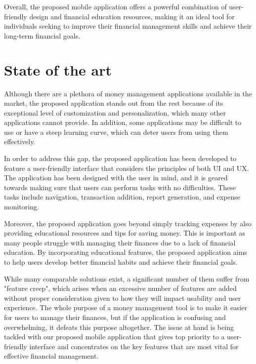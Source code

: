 \hspace{\parindent}Overall, the proposed mobile application offers a powerful combination of user-friendly design and financial education resources, making it an ideal tool for individuals seeking to improve their financial management skills and achieve their long-term financial goals.

\section{State of the art}\label{sect:State of the art}
\hspace{\parindent} Although there are a plethora of money management applications available in the market, the proposed application stands out from the rest because of its exceptional level of customization and personalization, which many other applications cannot provide. In addition, some applications may be difficult to use or have a steep learning curve, which can deter users from using them effectively.

\hspace{\parindent}In order to address this gap, the proposed application has been developed to feature a user-friendly interface that considers the principles of both UI and UX. The application has been designed with the user in mind, and it is geared towards making sure that users can perform tasks with no difficulties. These tasks include navigation, transaction addition, report generation, and expense monitoring.

\hspace{\parindent}Moreover, the proposed application goes beyond simply tracking expenses by also providing educational resources and tips for saving money. This is important as many people struggle with managing their finances due to a lack of financial education. By incorporating educational features, the proposed application aims to help users develop better financial habits and achieve their financial goals.


\hspace{\parindent}While many comparable solutions exist, a significant number of them suffer from "feature creep", which arises when an excessive number of features are added without proper consideration given to how they will impact usability and user experience. The whole purpose of a money management tool is to make it easier for users to manage their finances, but if the application is confusing and overwhelming, it defeats this purpose altogether. The issue at hand is being tackled with our proposed mobile application that gives top priority to a user-friendly interface and concentrates on the key features that are most vital for effective financial management.


